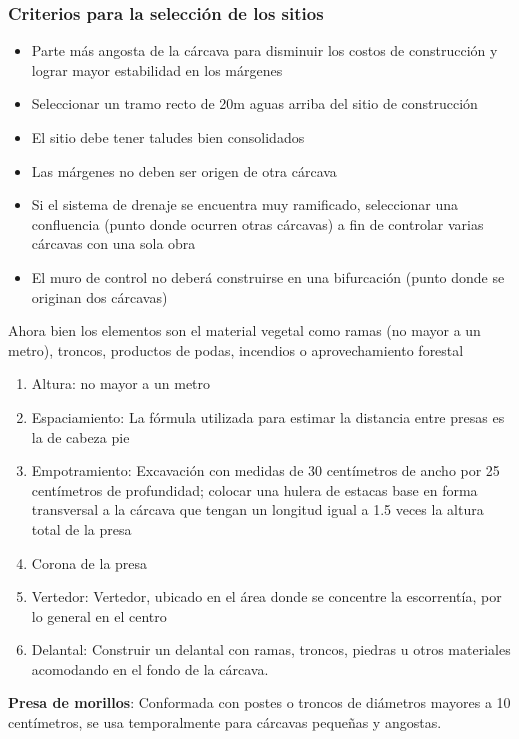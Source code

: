    \subsubsection{Criterios para la selección de los sitios}
    \begin{itemize}
        \item Parte más angosta de la cárcava para disminuir los costos de construcción y lograr mayor estabilidad en los márgenes
        \item Seleccionar un tramo recto de 20m aguas arriba del sitio de construcción
        \item El sitio debe tener taludes bien consolidados
        \item Las márgenes no deben ser origen de otra cárcava
        \item Si el sistema de drenaje se encuentra muy ramificado, seleccionar una confluencia (punto donde ocurren otras cárcavas) a fin de controlar varias cárcavas con una sola obra
        \item El muro de control no deberá construirse en una bifurcación (punto donde se originan dos cárcavas)
    \end{itemize}
    Ahora bien los elementos son el material vegetal como ramas (no mayor a un metro), troncos, productos de podas, incendios o aprovechamiento forestal
    \begin{enumerate}
        \item Altura: no mayor a un metro
        \item Espaciamiento: La fórmula utilizada para estimar la distancia entre presas es la de cabeza pie
        \item Empotramiento: Excavación con medidas de 30 centímetros de ancho por 25 centímetros de profundidad; colocar una hulera de estacas base en forma transversal a la cárcava que tengan un longitud igual a 1.5 veces la altura total de la presa
        \item Corona de la presa
        \item Vertedor: Vertedor, ubicado en el área donde se concentre la escorrentía, por lo general en el centro
        \item Delantal: Construir un delantal con ramas, troncos, piedras u otros materiales acomodando en el fondo de la cárcava.
    \end{enumerate}
    
    \textbf{Presa de morillos}: Conformada con postes o troncos de diámetros mayores a 10 centímetros, se usa temporalmente para cárcavas pequeñas y angostas.
    
